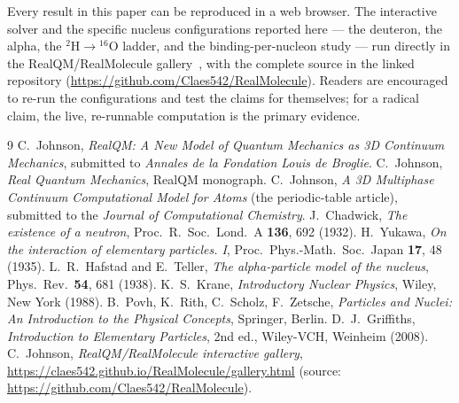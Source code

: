 \documentclass[11pt]{article}
\begin{document}
Every result in this paper can be reproduced in a web browser. The interactive solver and the
specific nucleus configurations reported here --- the deuteron, the alpha, the
$^2\mathrm{H}\!\to\!{}^{16}\mathrm{O}$ ladder, and the binding-per-nucleon study --- run directly
in the RealQM/RealMolecule gallery~\cite{Gallery}, with the complete source in the linked
repository (\url{https://github.com/Claes542/RealMolecule}). Readers are encouraged to re-run the
configurations and test the claims for themselves; for a radical claim, the live, re-runnable
computation is the primary evidence.

\begin{thebibliography}{9}
 C.~Johnson, \emph{RealQM: A New Model of Quantum Mechanics as 3D
Continuum Mechanics}, submitted to \emph{Annales de la Fondation Louis de Broglie}.
 C.~Johnson, \emph{Real Quantum Mechanics}, RealQM monograph.
 C.~Johnson, \emph{A 3D Multiphase Continuum Computational Model for
Atoms} (the periodic-table article), submitted to the \emph{Journal of Computational Chemistry}.
 J.~Chadwick, \emph{The existence of a neutron}, Proc.\ R.\ Soc.\ Lond.\ A
\textbf{136}, 692 (1932).
 H.~Yukawa, \emph{On the interaction of elementary particles. I}, Proc.\
Phys.-Math.\ Soc.\ Japan \textbf{17}, 48 (1935).
 L.~R.~Hafstad and E.~Teller, \emph{The alpha-particle model of the
nucleus}, Phys.\ Rev.\ \textbf{54}, 681 (1938).
 K.~S.~Krane, \emph{Introductory Nuclear Physics}, Wiley, New York (1988).
\bibitem{Povh} B.~Povh, K.~Rith, C.~Scholz, F.~Zetsche, \emph{Particles and Nuclei: An
Introduction to the Physical Concepts}, Springer, Berlin.
 D.~J.~Griffiths, \emph{Introduction to Elementary Particles}, 2nd ed.,
Wiley-VCH, Weinheim (2008).
 C.~Johnson, \emph{RealQM/RealMolecule interactive gallery},
\url{https://claes542.github.io/RealMolecule/gallery.html} (source:
\url{https://github.com/Claes542/RealMolecule}).
\end{thebibliography}
\end{document}
